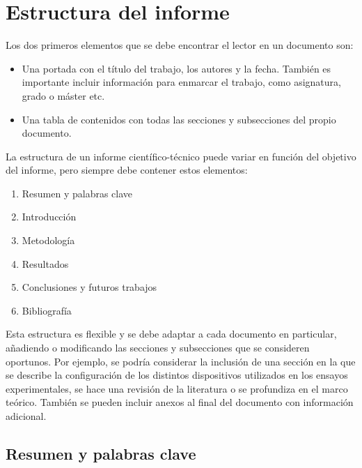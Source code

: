 \documentclass[11pt]{article}
\begin{document}

\section{Estructura del informe}
\label{sec:estructura}

Los dos primeros elementos que se debe encontrar el lector en un documento son:

\begin{itemize}

    \item Una portada con el título del trabajo, los autores y la fecha. También es importante incluir información para enmarcar el trabajo, como asignatura, grado o máster etc.
    
    \item Una tabla de contenidos con todas las secciones y subsecciones del propio documento.
    
\end{itemize}

La estructura de un informe científico-técnico puede variar en función del objetivo del informe, pero siempre debe contener estos elementos:

\begin{enumerate} \itemsep = 0ex %
    \item Resumen y palabras clave
    \item Introducción
    \item Metodología
    \item Resultados
    \item Conclusiones y futuros trabajos
    \item Bibliografía
\end{enumerate}

Esta estructura es flexible y se debe adaptar a cada documento en particular, añadiendo o modificando las secciones y subsecciones que se consideren oportunos. Por ejemplo, se podría considerar la inclusión de una sección en la que se describe la configuración de los distintos dispositivos utilizados en los ensayos experimentales, se hace una revisión de la literatura o se profundiza en el marco teórico. También se pueden incluir anexos al final del documento con información adicional.

\subsection{Resumen y palabras clave}
\end{document}
